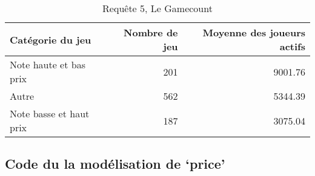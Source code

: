 \documentclass[mstat,12pt]{unswthesis}
\begin{document}
\begingroup\fontsize{10}{12}\selectfont

\begin{longtable}[t]{lrr}
\caption{\label{tab:results-table gamecount2}Requête 5, Le Gamecount}\\
\toprule
Catégorie du jeu & Nombre de jeu & Moyenne des joueurs actifs\\
\midrule
Note haute et bas prix & 201 & 9001.76\\
Autre & 562 & 5344.39\\
Note basse et haut prix & 187 & 3075.04\\
\bottomrule
\end{longtable}
\endgroup{}

\hypertarget{code-du-la-moduxe9lisation-de-price}{%
\subsection*{Code du la modélisation de
`price'}\label{code-du-la-moduxe9lisation-de-price}}
\end{document}
